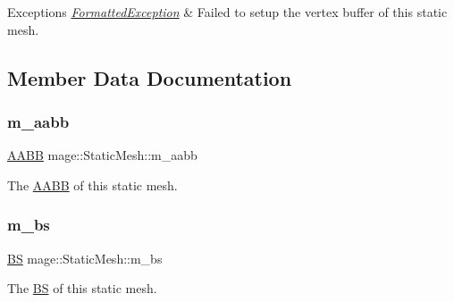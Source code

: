 \begin{DoxyExceptions}{Exceptions}
{\em \hyperlink{structmage_1_1_formatted_exception}{Formatted\+Exception}} & Failed to setup the vertex buffer of this static mesh. \\
\hline
\end{DoxyExceptions}


\subsection{Member Data Documentation}
\hypertarget{classmage_1_1_static_mesh_ae295e5ab8242dd6464c71eda10ca2f85}{}\label{classmage_1_1_static_mesh_ae295e5ab8242dd6464c71eda10ca2f85} 
\subsubsection{\texorpdfstring{m\+\_\+aabb}{m\_aabb}}
{\footnotesize\ttfamily \hyperlink{structmage_1_1_a_a_b_b}{A\+A\+BB} mage\+::\+Static\+Mesh\+::m\+\_\+aabb\hspace{0.3cm}{\ttfamily [private]}}

The \hyperlink{structmage_1_1_a_a_b_b}{A\+A\+BB} of this static mesh. \hypertarget{classmage_1_1_static_mesh_ae5a9d7c89d7253130329d7b482045c8f}{}\label{classmage_1_1_static_mesh_ae5a9d7c89d7253130329d7b482045c8f} 
\subsubsection{\texorpdfstring{m\+\_\+bs}{m\_bs}}
{\footnotesize\ttfamily \hyperlink{structmage_1_1_b_s}{BS} mage\+::\+Static\+Mesh\+::m\+\_\+bs\hspace{0.3cm}{\ttfamily [private]}}

The \hyperlink{structmage_1_1_b_s}{BS} of this static mesh. 
